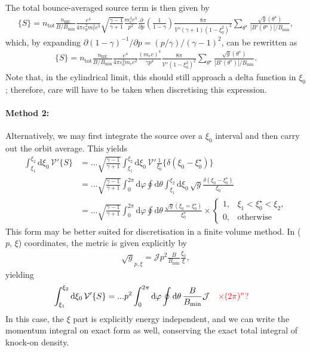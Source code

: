 \documentclass[11pt,a4paper]{article}
\newcommand{\rd}{\ensuremath{\mathrm{d}}}
\newcommand{\sub}[1]{\ensuremath{_{\text{#1}}}}
\begin{document}
The total bounce-averaged source term is then given by
\begin{align}
\{S\} = n\sub{tot}\frac{n\sub{RE}}{B/B\sub{min}} \frac{e^4}{4\pi\varepsilon_0^2 m_e^2 c^3} \sqrt{\frac{\gamma-1}{\gamma+1}} \frac{m_e^3 c^3}{p^2}\frac{\partial}{\partial p}\left(\frac{1}{1-\gamma}\right) \frac{8\pi }{\mathcal{V}' (\gamma+1)(1-\xi_0^2)^2} \sum_{\theta^\star} \frac{\sqrt{g}(\theta^\star)}{|B'(\theta^\star)|/B\sub{min}},
\end{align}
which, by expanding $\partial(1-\gamma)^{-1}/\partial p = (p/\gamma)/(\gamma-1)^2 $, can be rewritten as
\begin{align}
\{S\} = n\sub{tot}\frac{n\sub{RE}}{B/B\sub{min}} \frac{e^4}{4\pi\varepsilon_0^2 m_e c^2}  \frac{(m_e c)^4}{\gamma p^4} \frac{8\pi }{\mathcal{V}' (1-\xi_0^2)^2} \sum_{\theta^\star} \frac{\sqrt{g}(\theta^\star)}{|B'(\theta^\star)|/B\sub{min}}.
\end{align}
Note that, in the cylindrical limit, this should still approach a delta function in $\xi_0$; therefore, care will have to be taken when discretising this expression.

\paragraph{Method 2:} Alternatively, we may first integrate the source over a $\xi_0$ interval and then carry out the orbit average. This yields
\begin{align}
\int_{\xi_1}^{\xi_2} \rd \xi_0 \, \mathcal{V}'\{S\} &= ... \sqrt{\frac{\gamma-1}{\gamma+1}}\int_{\xi_1}^{\xi_2} \rd \xi_0 \, \mathcal{V}' \frac{1}{\xi_0} \{\delta(\xi_0-\xi^\star_0) \} \nonumber \\
&= ...\sqrt{\frac{\gamma-1}{\gamma+1}}\int_0^{2\pi} \rd \varphi \oint \rd \theta \int_{\xi_1}^{\xi_2} \rd\xi_0 \,\sqrt{g}\frac{\delta(\xi_0-\xi_0^\star)}{\xi_0} \nonumber \\
&= ...\sqrt{\frac{\gamma-1}{\gamma+1}}\int_0^{2\pi} \rd \varphi \oint \rd \theta  \, \frac{\sqrt{g}(\xi_0=\xi^\star_0)}{\xi^\star_0} 
\times \begin{cases}
1, & \xi_1 < \xi_0^\star < \xi_2, \\
0, & \text{otherwise}
\end{cases}
\end{align}
This form may be better suited for discretisation in a finite volume method. In ($p,\,\xi$) coordinates, the metric is given explicitly by
\begin{align}
\sqrt{g}_{p,\xi} = \mathcal{J} p^2 \frac{B}{B\sub{min}}\frac{\xi_0}{\xi},
\end{align}
yielding
\begin{align}
\int_{\xi_1}^{\xi_2} \rd \xi_0 \, \mathcal{V}'\{S\} &= ... p^2 \int_0^{2\pi} \rd \varphi \oint \rd \theta  \, \frac{B}{B\sub{min}}\mathcal{J} \quad \textcolor{red}{\times (2\pi)^n ?}
\end{align}
In this case, the $\xi$ part is explicitly energy independent, and we can write the momentum integral on exact form as well, conserving the exact total integral of knock-on density.
\end{document}
